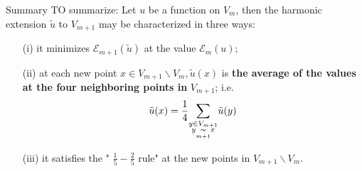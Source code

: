 \begin{frame}{Summary}
    TO summarize: Let $u$ be a function on $V_m$, then the harmonic extension $\tilde{u}$ to $V_{m+1}$ may be characterized in three ways:
    \vspace{0.25cm}
\begin{itemize}
    \item[(i)] it minimizes $\mathcal{E}_{m+1}(\tilde{u})$ at the value $\mathcal{E}_m(u)$;
    \item[(ii)] at each new point $x \in V_{m+1} \backslash V_m, \tilde{u}(x)$ is \textbf{the average of the values at the four neighboring points in} $V_{m+1}$; i.e. 
    $$
\tilde{u}(x)=\dfrac{1}{4}\underset{\substack{y \in V_{m+1} \\ y \underset{m+1}{\thicksim} x}}{\sum}\tilde{u}(y)
    $$
    \item[(iii)] it satisfies the " $\frac{1}{5}-\frac{2}{5}$ rule" at the new points in $V_{m+1} \backslash V_m$. 
\end{itemize}
\end{frame}
